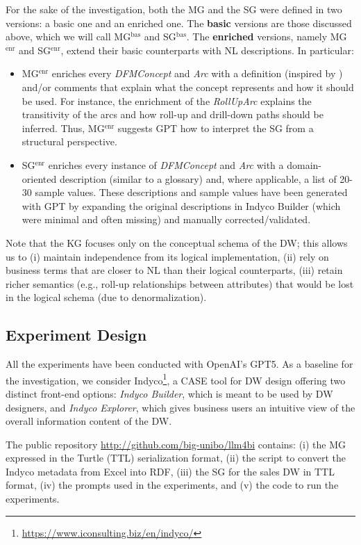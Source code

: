 For the sake of the investigation, both the MG and the SG were defined in two versions: a basic one and an enriched one. The \textbf{basic} versions are those discussed above, which we will call MG$^\text{bas}$ and SG$^\text{bas}$. The \textbf{enriched} versions, namely MG$^\text{enr}$ and SG$^\text{enr}$, extend their basic counterparts with NL descriptions. In particular:
\begin{itemize}
    \item MG$^\text{enr}$ enriches every \textit{DFMConcept} and \textit{Arc} with a definition (inspired by \cite{golfarelli2009data}) and/or comments that explain what the concept represents and how it should be used. For instance, the enrichment of the \textit{RollUpArc} explains the transitivity of the arcs and how roll-up and drill-down paths should be inferred. Thus, MG$^\text{enr}$ suggests GPT how to interpret the SG from a structural perspective.
    \item SG$^\text{enr}$ enriches every instance of \textit{DFMConcept} and \textit{Arc} with a domain-oriented description (similar to a glossary) and, where applicable, a list of 20-30 sample values. These descriptions and sample values have been generated with GPT by expanding the original descriptions in Indyco Builder (which were minimal and often missing) and manually corrected/validated.
\end{itemize}

Note that the KG focuses only on the conceptual schema of the DW; this allows us to (i) maintain independence from its logical implementation, (ii) rely on business terms that are closer to NL than their logical counterparts, (iii) retain richer semantics (e.g., roll-up relationships between attributes) that would be lost in the logical schema (due to denormalization).

\subsection{Experiment Design}
\label{sec:llm-expd}

All the experiments have been conducted with OpenAI's GPT5. As a baseline for the investigation, we consider Indyco\footnote{\url{https://www.iconsulting.biz/en/indyco/}}, a CASE tool for DW design offering two distinct front-end options: \emph{Indyco Builder}, which is meant to be used by DW designers, and \emph{Indyco Explorer}, which gives business users an intuitive view of the overall information content of the DW.

The public repository \url{http://github.com/big-unibo/llm4bi} contains: (i) the MG expressed in the Turtle (TTL) serialization format, (ii) the script to convert the Indyco metadata from Excel into RDF, (iii) the SG for the sales DW in TTL format, (iv) the prompts used in the experiments, and (v) the code to run the experiments.

